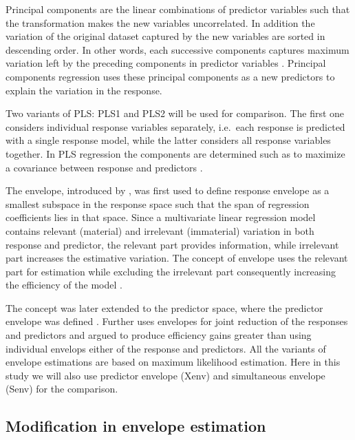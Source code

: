 \documentclass[12pt,3p,authoryear]{elsarticle}
\providecommand{\tightlist}{%
  \setlength{\itemsep}{0pt}\setlength{\parskip}{0pt}}
\begin{document}
\begin{description}
\tightlist
\item[\emph{Principal Components Regression (PCR):}]
Principal components are the linear combinations of predictor variables
such that the transformation makes the new variables uncorrelated. In
addition the variation of the original dataset captured by the new
variables are sorted in descending order. In other words, each
successive components captures maximum variation left by the preceding
components in predictor variables \citep{Jolliffe2002}. Principal
components regression uses these principal components as a new
predictors to explain the variation in the response.
\item[\emph{Partial Least Squares (PLS):}]
Two variants of PLS: PLS1 and PLS2 will be used for comparison. The
first one considers individual response variables separately, i.e.~each
response is predicted with a single response model, while the latter
considers all response variables together. In PLS regression the
components are determined such as to maximize a covariance between
response and predictors \citep{DeJong1993}.
\item[\emph{Envelopes:}]
The envelope, introduced by \citet{Cook2007a}, was first used to define
response envelope \citep{cook2010envelope} as a smallest subspace in the
response space such that the span of regression coefficients lies in
that space. Since a multivariate linear regression model contains
relevant (material) and irrelevant (immaterial) variation in both
response and predictor, the relevant part provides information, while
irrelevant part increases the estimative variation. The concept of
envelope uses the relevant part for estimation while excluding the
irrelevant part consequently increasing the efficiency of the model
\citep{cook2016algorithms}.

The concept was later extended to the predictor space, where the
predictor envelope was defined \citep{cook2013envelopes}. Further
\citet{cook2015simultaneous} uses envelopes for joint reduction of the
responses and predictors and argued to produce efficiency gains greater
than using individual envelops either of the response and predictors.
All the variants of envelope estimations are based on maximum likelihood
estimation. Here in this study we will also use predictor envelope
(Xenv) and simultaneous envelope (Senv) for the comparison.
\end{description}

\hypertarget{modification-in-envelope-estimation}{%
\subsection{Modification in envelope
estimation}\label{modification-in-envelope-estimation}}
\end{document}
